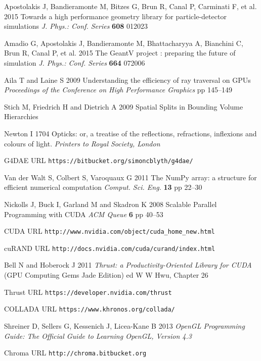 \documentclass[a4paper]{jpconf}
\begin{document}
\begin{thebibliography}{9}
Apostolakis J, Bandieramonte M, Bitzes G, Brun R, Canal P, Carminati F, et al. 
2015
Towards a high performance geometry library for particle-detector simulations
{\it J. Phys.: Conf. Series} {\bf 608} 012023

Amadio G, Apostolakis J, Bandieramonte M, Bhattacharyya A, Bianchini C, Brun R, Canal P, et al.
2015
The GeantV project : preparing the future of simulation 
{\it J. Phys.: Conf. Series} {\bf 664} 072006


Aila T and Laine S 
2009
Understanding the efficiency of ray traversal on GPUs
{\it Proceedings of the Conference on High Performance Graphics} pp 145--149


Stich M, Friedrich H and Dietrich A 
2009
Spatial Splits in Bounding Volume Hierarchies


Newton I 
1704 
Opticks: or, a treatise of the reflections, refractions, inflexions and colours of light.
{\it Printers to Royal Society, London} 

G4DAE URL {\tt https://bitbucket.org/simoncblyth/g4dae/}

Van der Walt S, Colbert S, Varoquaux G 
2011 
The NumPy array: a structure for efficient numerical computation
{\it Comput. Sci. Eng.} {\bf 13} pp 22--30

Nickolls J, Buck I, Garland M and Skadron K 
2008
Scalable Parallel Programming with CUDA
{\it ACM Queue} {\bf 6} pp 40--53

CUDA URL {\tt http://www.nvidia.com/object/cuda\_home\_new.html}

cuRAND URL {\tt http://docs.nvidia.com/cuda/curand/index.html}


Bell N and Hoberock J 
2011
{\it Thrust: a Productivity-Oriented Library for CUDA}
(GPU Computing Gems Jade Edition) ed W W Hwu, Chapter 26   

Thrust URL {\tt https://developer.nvidia.com/thrust}

COLLADA URL {\tt https://www.khronos.org/collada/}

Shreiner D, Sellers G, Kessenich J, Licea-Kane B 
2013
{\it OpenGL Programming Guide: The Official Guide to Learning OpenGL, Version 4.3}


Chroma URL {\tt http://chroma.bitbucket.org}


\end{thebibliography}
\end{document}
